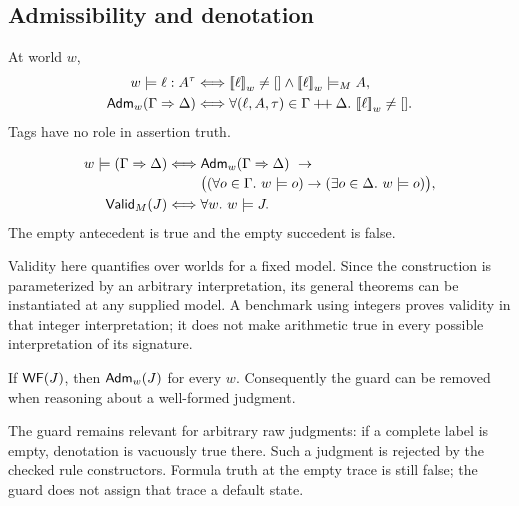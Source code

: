 \subsection{Admissibility and denotation}
\begin{definition}
At world $w$,
\begin{align*}
 w\models\ell:A^{\tau}
   &\Longleftrightarrow\mathopen{[\![}\ell\mathclose{]\!]}_{w}\ne[]\land\mathopen{[\![}\ell\mathclose{]\!]}_{w}\models_M A,\\
 \mathsf{Adm}_w(\Gamma\Rightarrow \Delta)
   &\Longleftrightarrow
   \forall(\ell,A,\tau)\in\Gamma\mathbin{+\!+}\Delta.\ \mathopen{[\![}\ell\mathclose{]\!]}_{w}\ne[].
\end{align*}
Tags have no role in assertion truth.
\end{definition}

\begin{definition}
\begin{align*}
 w\models(\Gamma\Rightarrow \Delta)
 \Longleftrightarrow{}&\mathsf{Adm}_w(\Gamma\Rightarrow \Delta)\ \to\\[-0.2em]
 &\bigl((\forall o\in\Gamma.\ w\models o)
       \to(\exists o\in\Delta.\ w\models o)\bigr),\\
 \mathsf{Valid}_M(J)\Longleftrightarrow{}&\forall w.\ w\models J.
\end{align*}
The empty antecedent is true and the empty succedent is false.
\end{definition}

Validity here quantifies over worlds for a fixed model. Since the construction
is parameterized by an arbitrary interpretation, its general theorems can
be instantiated at any supplied model. A benchmark using integers proves
validity in that integer interpretation; it does not make arithmetic true
in every possible interpretation of its signature.

\begin{lemma}
If $\mathsf{WF}(J)$, then $\mathsf{Adm}_w(J)$ for every $w$. Consequently the guard can be
removed when reasoning about a well-formed judgment.
\end{lemma}

The guard remains relevant for arbitrary raw judgments: if a complete label
is empty, denotation is vacuously true there. Such a judgment is rejected by
the checked rule constructors. Formula truth at the empty trace is still
false; the guard does not assign that trace a default state.

